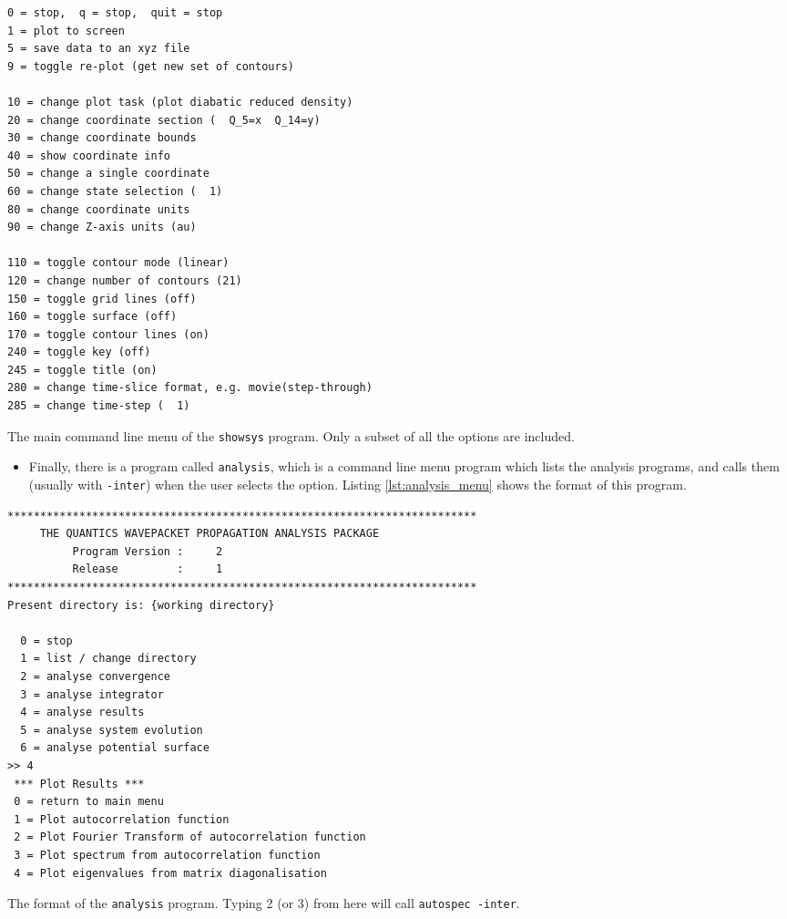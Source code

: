 \documentclass[12pt]{article}
\newenvironment{code}{\captionsetup{type=listing}}{\par\addvspace{\baselineskip}}
\begin{document}
\begin{code}\begin{verbatim}
0 = stop,  q = stop,  quit = stop
1 = plot to screen
5 = save data to an xyz file
9 = toggle re-plot (get new set of contours)

10 = change plot task (plot diabatic reduced density)
20 = change coordinate section (  Q_5=x  Q_14=y)
30 = change coordinate bounds
40 = show coordinate info
50 = change a single coordinate
60 = change state selection (  1)
80 = change coordinate units
90 = change Z-axis units (au)

110 = toggle contour mode (linear)
120 = change number of contours (21)
150 = toggle grid lines (off)
160 = toggle surface (off)
170 = toggle contour lines (on)
240 = toggle key (off)
245 = toggle title (on)
280 = change time-slice format, e.g. movie(step-through)
285 = change time-step (  1)
\end{verbatim}
\caption{The main command line menu of the \texttt{showsys} program. Only a subset of all the options are included.}
\label{lst:showsys_menu}
\end{code}

\begin{itemize}
    \item Finally, there is a program called \texttt{analysis}, which is a command line menu program which lists the analysis programs, and calls them (usually with \texttt{-inter}) when the user selects the option. Listing \ref{lst:analysis_menu} shows the format of this program.
\end{itemize}

\begin{code}\begin{verbatim}
************************************************************************
     THE QUANTICS WAVEPACKET PROPAGATION ANALYSIS PACKAGE
          Program Version :     2
          Release         :     1
************************************************************************
Present directory is: {working directory}

  0 = stop
  1 = list / change directory
  2 = analyse convergence
  3 = analyse integrator
  4 = analyse results
  5 = analyse system evolution
  6 = analyse potential surface
>> 4
 *** Plot Results ***
 0 = return to main menu
 1 = Plot autocorrelation function
 2 = Plot Fourier Transform of autocorrelation function
 3 = Plot spectrum from autocorrelation function
 4 = Plot eigenvalues from matrix diagonalisation
\end{verbatim}
\caption{The format of the \texttt{analysis} program. Typing 2 (or 3) from here will call \texttt{autospec -inter}.}
\label{lst:analysis_menu}
\end{code}
\end{document}
